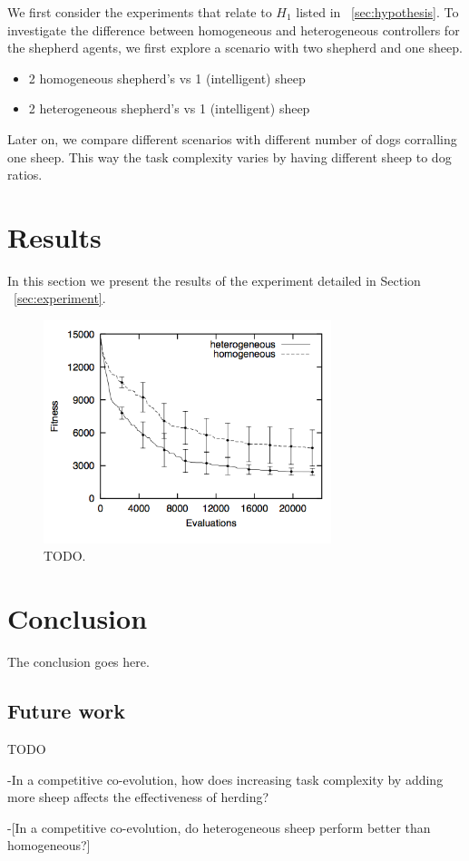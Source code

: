 \documentclass[conference]{IEEEtran}
\begin{document}
We first consider the experiments that relate to $H_1$ listed in ~\ref{sec:hypothesis}. To investigate the difference between homogeneous and heterogeneous controllers for the shepherd agents, we first explore a scenario with two shepherd and one sheep. 
\begin{itemize}
	\item 2 homogeneous shepherd’s vs 1 (intelligent) sheep
	\item 2 heterogeneous shepherd’s vs 1 (intelligent) sheep
\end{itemize}
 
 Later on, we compare different scenarios with different number of dogs corralling one sheep. This way the task complexity varies by having different sheep to dog ratios. 



\section{Results}
In this section we present the results of the experiment detailed in Section ~\ref{sec:experiment}.

\begin{figure}[ht]
\centering
\includegraphics[width=3.3in]{imgs/homo_vs_hetero.png}
\caption{TODO.}
\label{fig:homo_vs_hetero}
\end{figure}

\section{Conclusion}
The conclusion goes here.

\subsection{Future work}
TODO

-In a competitive co-evolution, how does increasing task complexity by adding more sheep affects the effectiveness of herding? %

-[In a competitive co-evolution, do heterogeneous sheep perform better than homogeneous?] %





\end{document}
